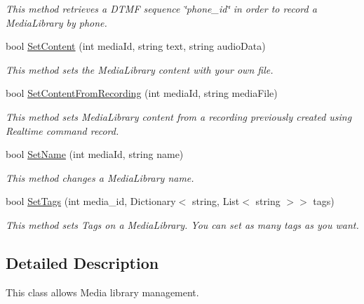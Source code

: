 \begin{DoxyCompactItemize}
\begin{DoxyCompactList}\small\item\em This method retrieves a D\+T\+M\+F sequence \char`\"{}phone\+\_\+id\char`\"{} in order to record a Media\+Library by phone. \end{DoxyCompactList}\item 
bool \hyperlink{class_thecallr_api_1_1_services_1_1_client_1_1_media_service_1_1_nested_library_a45f46ae84daeb6292ac8936087902899}{Set\+Content} (int media\+Id, string text, string audio\+Data)
\begin{DoxyCompactList}\small\item\em This method sets the Media\+Library content with your own file. \end{DoxyCompactList}\item 
bool \hyperlink{class_thecallr_api_1_1_services_1_1_client_1_1_media_service_1_1_nested_library_ad96ab505d16574ffd1406924470f4b7a}{Set\+Content\+From\+Recording} (int media\+Id, string media\+File)
\begin{DoxyCompactList}\small\item\em This method sets Media\+Library content from a recording previously created using Realtime command {\ttfamily record}. \end{DoxyCompactList}\item 
bool \hyperlink{class_thecallr_api_1_1_services_1_1_client_1_1_media_service_1_1_nested_library_a5ebd233179cb13d86e1385200c7f71d2}{Set\+Name} (int media\+Id, string name)
\begin{DoxyCompactList}\small\item\em This method changes a Media\+Library name. \end{DoxyCompactList}\item 
bool \hyperlink{class_thecallr_api_1_1_services_1_1_client_1_1_media_service_1_1_nested_library_a60cb9afca681eeb401f879ca8d3302b3}{Set\+Tags} (int media\+\_\+id, Dictionary$<$ string, List$<$ string $>$$>$ tags)
\begin{DoxyCompactList}\small\item\em This method sets Tags on a Media\+Library. You can set as many tags as you want. \end{DoxyCompactList}\end{DoxyCompactItemize}


\subsection{Detailed Description}
This class allows Media library management. 



